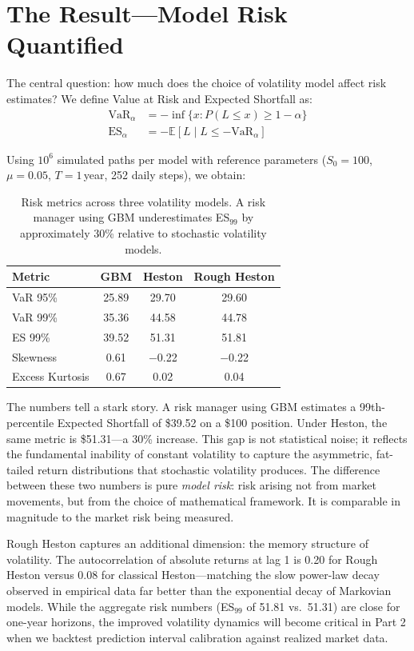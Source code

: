 \documentclass[11pt,a4paper]{article}
\begin{document}
\section{The Result---Model Risk Quantified}

The central question: how much does the choice of volatility model affect risk estimates? We define Value at Risk and Expected Shortfall as:
\begin{align}
\text{VaR}_\alpha &= -\inf\{x : P(L \leq x) \geq 1 - \alpha\} \\
\text{ES}_\alpha &= -\mathbb{E}[L \mid L \leq -\text{VaR}_\alpha]
\end{align}

Using $10^6$ simulated paths per model with reference parameters ($S_0 = 100$, $\mu = 0.05$, $T = 1$\,year, 252 daily steps), we obtain:

\begin{table}[H]
\centering
\begin{tabular}{lccc}
\toprule
\textbf{Metric} & \textbf{GBM} & \textbf{Heston} & \textbf{Rough Heston} \\
\midrule
VaR 95\%          & 25.89 & 29.70 & 29.60 \\
VaR 99\%          & 35.36 & 44.58 & 44.78 \\
ES 99\%           & 39.52 & 51.31 & 51.81 \\
Skewness          & 0.61  & $-$0.22 & $-$0.22 \\
Excess Kurtosis   & 0.67  & 0.02    & 0.04 \\
\bottomrule
\end{tabular}
\caption{Risk metrics across three volatility models. A risk manager using GBM underestimates ES$_{99}$ by approximately 30\% relative to stochastic volatility models.}
\label{tab:risk}
\end{table}

The numbers tell a stark story. A risk manager using GBM estimates a 99th-percentile Expected Shortfall of \$39.52 on a \$100 position. Under Heston, the same metric is \$51.31---a 30\% increase. This gap is not statistical noise; it reflects the fundamental inability of constant volatility to capture the asymmetric, fat-tailed return distributions that stochastic volatility produces. The difference between these two numbers is pure \emph{model risk}: risk arising not from market movements, but from the choice of mathematical framework. It is comparable in magnitude to the market risk being measured.

Rough Heston captures an additional dimension: the memory structure of volatility. The autocorrelation of absolute returns at lag 1 is 0.20 for Rough Heston versus 0.08 for classical Heston---matching the slow power-law decay observed in empirical data far better than the exponential decay of Markovian models. While the aggregate risk numbers (ES$_{99}$ of 51.81 vs.\ 51.31) are close for one-year horizons, the improved volatility dynamics will become critical in Part 2 when we backtest prediction interval calibration against realized market data.
\end{document}
